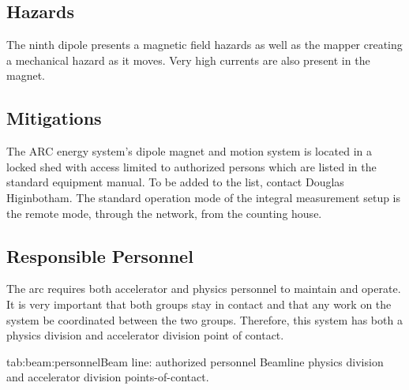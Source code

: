 \begin{safetyen}{0}{0}

\subsection{Hazards}

The ninth dipole presents a magnetic field hazards as well as the mapper creating a mechanical
hazard as it moves.  Very high currents are also present in the magnet.

\subsection{Mitigations}

The ARC energy system's dipole magnet and motion system is located in a locked shed with access
limited to authorized persons which are listed in the standard equipment manual. To be added to the list, 
contact Douglas Higinbotham.
The standard
operation mode of the integral measurement setup is the remote mode, through
the network, from the counting house.


\subsection{Responsible Personnel}

The arc requires both accelerator and physics personnel to maintain
and operate.  It is very important that both groups stay in contact and that 
any work on the system be coordinated between the two groups.  Therefore, this system
has both a physics division and accelerator division point of contact.

\begin{namestab}{tab:beam:personnel}{Beam line: authorized personnel}{%
   Beamline physics division and accelerator division points-of-contact.}
\end{namestab}
\end{safetyen}
\infoleveqnull{\clearpage}

